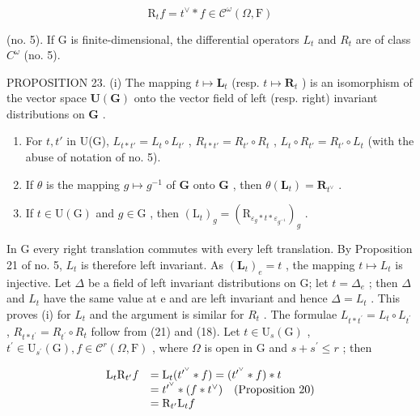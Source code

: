 \[
\mathrm{R} _ {t} f = t ^ {\vee} * f \in \mathcal {C} ^ {\omega} (\Omega , \mathrm{F})
\]

(no. 5). If G is finite-dimensional, the differential operators \(L_{t}\) and \(R_{t}\) are of class \(C^{\omega}\) (no. 5).

PROPOSITION 23. (i) The mapping \(t \mapsto \mathbf{L}_t\) (resp. \(t \mapsto \mathbf{R}_t\) ) is an isomorphism of the vector space \(\mathbf{U}(\mathbf{G})\) onto the vector field of left (resp. right) invariant distributions on \(\mathbf{G}\) .

\begin{enumerate}
\def\labelenumi{(\roman{enumi})}
\setcounter{enumi}{1}
\item
  For \(t, t'\) in U(G), \(L_{t*t'} = L_t \circ L_{t'}\) , \(R_{t*t'} = R_{t'} \circ R_t\) , \(L_t \circ R_{t'} = R_{t'} \circ L_t\) (with the abuse of notation of no. 5).
\item
  If \(\theta\) is the mapping \(g \mapsto g^{-1}\) of \(\mathbf{G}\) onto \(\mathbf{G}\) , then \(\theta(\mathbf{L}_t) = \mathbf{R}_{t^{\vee}}\) .
\item
  If \(t \in \mathrm{U}(\mathrm{G})\) and \(g \in \mathrm{G}\) , then \((\mathrm{L}_t)_g = (\mathrm{R}_{\varepsilon_g * t * \varepsilon_{g^{-1}}})_g\) .
\end{enumerate}

In G every right translation commutes with every left translation. By Proposition 21 of no. 5, \(L_{t}\) is therefore left invariant. As \((\mathbf{L}_{t})_{e}=t\) , the mapping \(t\mapsto L_{t}\) is injective. Let \(\Delta\) be a field of left invariant distributions on G; let \(t=\Delta_{e}\) ; then \(\Delta\) and \(L_{t}\) have the same value at e and are left invariant and hence \(\Delta=L_{t}\) . This proves (i) for \(L_{t}\) and the argument is similar for \(R_{t}\) . The formulae \(L_{t*t^{\prime}}=L_{t}\circ L_{t^{\prime}}\) , \(R_{t*t^{\prime}}=R_{t^{\prime}}\circ R_{t}\) follow from (21) and (18). Let \(t\in\mathrm{U}_{s}(\mathrm{G})\) , \(t^{\prime}\in\mathrm{U}_{s^{\prime}}(\mathrm{G}), f\in\mathcal{C}^{r}(\Omega,\mathrm{F})\) , where \(\Omega\) is open in G and \(s+s^{\prime}\leqslant r\) ; then

\[
\begin{array}{r l} \mathrm{L} _ {t} \mathrm{R} _ {t ^ {\prime}} f & = \mathrm{L} _ {t} (t ^ {\prime^ {\vee}} * f) = (t ^ {\prime^ {\vee}} * f) * t \\ & = t ^ {\prime^ {\vee}} * (f * t ^ {\vee}) \quad \text {(Proposition 20)} \\ & = \mathrm{R} _ {t ^ {\prime}} \mathrm{L} _ {t} f \end{array}
\]

